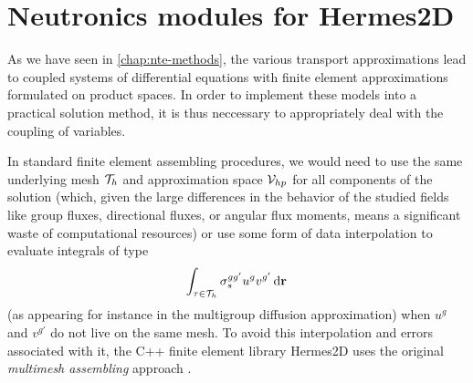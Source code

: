 \ifpdf
	\graphicspath{{5/pic/PNG/}{5/pic/PDF/}{5/pic/}}
\else
	\graphicspath{{5/pic/EPS/}{5/pic/}}
\fi

\chapter{Neutronics modules for Hermes2D}\label{chap:hermes}

As we have seen in \cref{chap:nte-methods}, the various transport approximations lead to coupled systems of differential
equations with finite element approximations formulated on product spaces. In order to implement these models into a
practical solution method, it is thus neccessary to appropriately deal with the coupling of variables. 

In standard finite element
assembling procedures, we would need to use the same underlying mesh $\mathcal{T}_{h}$ and approximation space $\mathcal{V}_{hp}$ for
all components of the solution (which, given the large differences in the behavior of the studied fields like group
fluxes, directional fluxes, or angular flux moments, means a significant waste of computational resources) or use some
form of data interpolation to evaluate integrals of type 
\begin{equation}\label{eq:mixed_int}
	\int_{\tau\in\mathcal{T}_{h}} \sigma_s^{gg'} u^g v^{g'}\,\text{d}\mathbf{r}\,
\end{equation}
(as appearing for instance in the multigroup diffusion approximation) when $u^g$ and $v^{g'}$ do not live on the same
mesh. To avoid this interpolation and errors associated with it, the C++ finite element library Hermes2D uses the
original \textit{multimesh assembling} approach \cite{Hermes-thermoelasticity}. 

